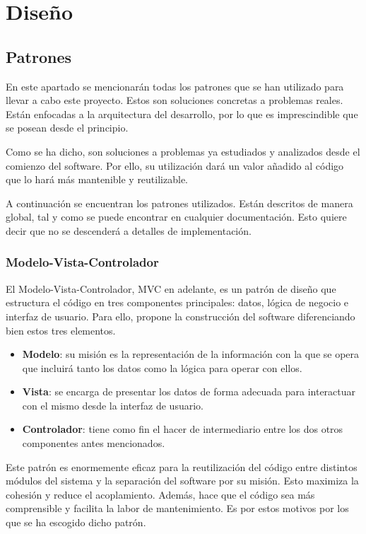 
\chapter{Diseño}\label{diseno}
\section{Patrones}\label{sec:patrones}

En este apartado se mencionarán todas los patrones que se han utilizado para llevar a cabo este proyecto. Estos son soluciones concretas a problemas reales. Están enfocadas a la arquitectura del desarrollo, por lo que es imprescindible que se posean desde el principio.

Como se ha dicho, son soluciones a problemas ya estudiados y analizados desde el comienzo del software. Por ello, su utilización dará un valor añadido al código que lo hará más mantenible y reutilizable.

A continuación se encuentran los patrones utilizados. Están descritos de manera global, tal y como se puede encontrar en cualquier documentación. Esto quiere decir que no se descenderá a detalles de implementación.

\subsection{Modelo-Vista-Controlador}
El Modelo-Vista-Controlador, MVC en adelante, es un patrón de diseño que estructura el código en tres componentes principales: datos, lógica de negocio e interfaz de usuario. Para ello, propone la construcción del software diferenciando bien estos tres elementos.

\begin{itemize}
    \item \textbf{Modelo}: su misión es la representación de la información con la que se opera que incluirá tanto los datos como la lógica para operar con ellos.
    \item \textbf{Vista}: se encarga de presentar los datos de forma adecuada para interactuar con el mismo desde la interfaz de usuario.
    \item \textbf{Controlador}: tiene como fin el hacer de intermediario entre los dos otros componentes antes mencionados.
\end{itemize}

Este patrón es enormemente eficaz para la reutilización del código entre distintos módulos del sistema y la separación del software por su misión. Esto maximiza la cohesión y reduce el acoplamiento. Además, hace que el código sea más comprensible y facilita la labor de mantenimiento. Es por estos motivos por los que se ha escogido dicho patrón.

